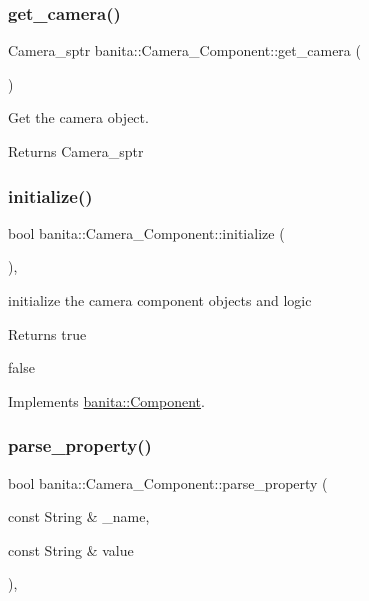 \subsubsection{\texorpdfstring{get\_camera()}{get\_camera()}}
{\footnotesize\ttfamily Camera\+\_\+sptr banita\+::\+Camera\+\_\+\+Component\+::get\+\_\+camera (\begin{DoxyParamCaption}{ }\end{DoxyParamCaption})\hspace{0.3cm}{\ttfamily [inline]}}



Get the camera object. 

\begin{DoxyReturn}{Returns}
Camera\+\_\+sptr 
\end{DoxyReturn}
\mbox{\label{classbanita_1_1_camera___component_a5cf5d281063a61d5c11914d30c512f40}} 
\subsubsection{\texorpdfstring{initialize()}{initialize()}}
{\footnotesize\ttfamily bool banita\+::\+Camera\+\_\+\+Component\+::initialize (\begin{DoxyParamCaption}{ }\end{DoxyParamCaption})\hspace{0.3cm}{\ttfamily [override]}, {\ttfamily [virtual]}}



initialize the camera component objects and logic 

\begin{DoxyReturn}{Returns}
true 

false 
\end{DoxyReturn}


Implements \mbox{\hyperlink{classbanita_1_1_component_a2f700c071185f7033caa69576dafa9e7}{banita\+::\+Component}}.

\mbox{\label{classbanita_1_1_camera___component_a1f494aa6cd8edcbe61866dc5e053c6be}} 
\subsubsection{\texorpdfstring{parse\_property()}{parse\_property()}}
{\footnotesize\ttfamily bool banita\+::\+Camera\+\_\+\+Component\+::parse\+\_\+property (\begin{DoxyParamCaption}\item[{const String \&}]{\+\_\+name,  }\item[{const String \&}]{value }\end{DoxyParamCaption})\hspace{0.3cm}{\ttfamily [override]}, {\ttfamily [virtual]}}



